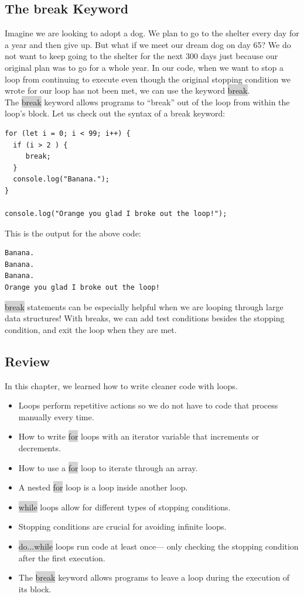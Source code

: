 \documentclass[11pt]{article}
\begin{document}
\subsection{The break Keyword}
Imagine we are looking to adopt a dog. We plan to go to the shelter every day for a year and then give up. But what if we meet our dream dog on day 65? We do not want to keep going to the shelter for the next 300 days just because our original plan was to go for a whole year. In our code, when we want to stop a loop from continuing to execute even though the original stopping condition we wrote for our loop has not been met, we can use the keyword \colorbox{lightgray}{break}. \\
\newline
The \colorbox{lightgray}{break} keyword allows programs to “break” out of the loop from within the loop’s block. Let us check out the syntax of a break keyword:
\begin{lstlisting}
for (let i = 0; i < 99; i++) {
  if (i > 2 ) {
     break;
  }
  console.log("Banana.");
}

console.log("Orange you glad I broke out the loop!");
\end{lstlisting}
This is the output for the above code:
\begin{lstlisting}
Banana.
Banana.
Banana.
Orange you glad I broke out the loop!
\end{lstlisting}
\colorbox{lightgray}{break} statements can be especially helpful when we are looping through large data structures! With breaks, we can add test conditions besides the stopping condition, and exit the loop when they are met.

\subsection{Review}
In this chapter, we learned how to write cleaner code with loops.
\begin{itemize}[leftmargin = *]
\item Loops perform repetitive actions so we do not have to code that process manually every time.
\item How to write \colorbox{lightgray}{for} loops with an iterator variable that increments or decrements.
\item How to use a \colorbox{lightgray}{for} loop to iterate through an array.
\item A nested \colorbox{lightgray}{for} loop is a loop inside another loop.
\item \colorbox{lightgray}{while} loops allow for different types of stopping conditions.
\item Stopping conditions are crucial for avoiding infinite loops.
\item \colorbox{lightgray}{do...while} loops run code at least once— only checking the stopping condition after the first execution.
\item The \colorbox{lightgray}{break} keyword allows programs to leave a loop during the execution of its block.
\end{itemize}
\end{document}
